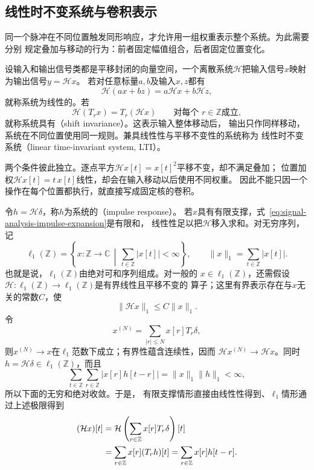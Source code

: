 \subsection{线性时不变系统与卷积表示}
\label{sec:signal-analysis-lti-convolution}

同一个脉冲在不同位置触发同形响应，才允许用一组权重表示整个系统。为此需要分别
规定叠加与移动的行为：前者固定幅值组合，后者固定位置变化。
\begin{definition}[线性时不变系统]
\label{def:signal-analysis-lti-system}
设输入和输出信号类都是平移封闭的向量空间，一个离散系统$\mathcal{H}$把输入信号$x$映射为输出信号$y=\mathcal{H}x$。
若对任意标量$a,b$及输入$x,z$都有
\[
  \mathcal{H}(ax+bz)=a\mathcal{H}x+b\mathcal{H}z,
\]
就称系统为线性的。若
\[
  \mathcal{H}(T_r x)=T_r(\mathcal{H}x)
  \qquad\text{对每个 }r\in\mathbb{Z}\text{成立},
\]
就称系统具有（shift invariance）。这表示输入整体移动后，
输出只作同样移动，系统在不同位置使用同一规则。兼具线性性与平移不变性的系统称为
线性时不变系统（linear time-invariant system, LTI）。
\end{definition}

两个条件彼此独立。逐点平方$\mathcal Hx[t]=x[t]^2$平移不变，却不满足叠加；
位置加权$\mathcal Hx[t]=t\,x[t]$线性，却会在输入移动以后使用不同权重。
因此不能只因一个操作在每个位置都执行，就直接写成固定核的卷积。

令$h=\mathcal{H}\delta$，称$h$为系统的（impulse response）。
若$x$具有有限支撑，式~\eqref{eq:signal-analysis-impulse-expansion}是有限和，
线性性足以把$\mathcal{H}$移入求和。对无穷序列，记
\[
  \ell_1(\mathbb{Z})
  =
  \left\{
    x:\mathbb{Z}\to\mathbb{C}
    \,\middle|\,
    \sum_{t\in\mathbb{Z}}|x[t]|<\infty
  \right\},
  \qquad
  \lVert x\rVert_1=\sum_{t\in\mathbb{Z}}|x[t]|.
\]
也就是说，$\ell_1(\mathbb{Z})$由绝对可和序列组成。对一般的
$x\in\ell_1(\mathbb{Z})$，还需假设
$\mathcal{H}:\ell_1(\mathbb{Z})\to\ell_1(\mathbb{Z})$是有界线性且平移不变的
算子；这里有界表示存在与$x$无关的常数$C$，使
\[
  \lVert\mathcal{H}x\rVert_1\leq C\lVert x\rVert_1.
\]
令
\[
  x^{(N)}=\sum_{|r|\leq N}x[r]T_r\delta,
\]
则$x^{(N)}\to x$在$\ell_1$范数下成立；有界性蕴含连续性，因而
$\mathcal{H}x^{(N)}\to\mathcal{H}x$。同时
$h=\mathcal{H}\delta\in\ell_1(\mathbb{Z})$，而且
\[
  \sum_{t\in\mathbb{Z}}\sum_{r\in\mathbb{Z}}
  |x[r]h[t-r]|
  =
  \lVert x\rVert_1\lVert h\rVert_1
  <\infty,
\]
所以下面的无穷和绝对收敛。于是，
有限支撑情形直接由线性性得到、$\ell_1$情形通过上述极限得到
\begin{align}
  (\mathcal{H}x)[t]
  &=
  \mathcal{H}\left(\sum_{r\in\mathbb{Z}}x[r]T_r\delta\right)[t]
  \notag\\
  &=
  \sum_{r\in\mathbb{Z}}x[r](T_rh)[t]
  =
  \sum_{r\in\mathbb{Z}}x[r]h[t-r].
  \label{eq:signal-analysis-lti-convolution}
\end{align}

